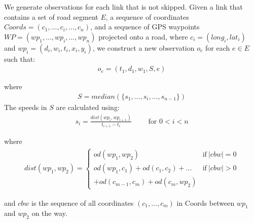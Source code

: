 We generate observations for each link that is not skipped. Given a link that contains a set of road segment $E$, a sequence of coordinates $Coords = (c_1,...,c_i,...,c_n)$, and a sequence of GPS waypoints $WP=(wp_1,...,wp_i,...,wp_n)$ projected onto a road, where $c_i = (long_i, lat_i)$ and $wp_i = (d_i, w_i, t_i, x_i, y_i)$, we construct a new observation $o_e$ for each $e \in E$ such that:
\begin{align*}
o_e = (t_1, d_1, w_1, S, e)
\end{align*}

where
\begin{align*}
S = median(\{s_1,...,s_i,...,s_{n-1}\})
\end{align*}
%
The speeds in $S$ are calculated using:
\begin{align*}
s_i = \frac{dist(wp_i, wp_{i+1})}{t_{i+1} - t_i} \qquad \text{ for } 0 < i < n
\end{align*}

where
\begin{align*}
dist(wp_1, wp_2) = \begin{cases} 
od(wp_1, wp_2) & \text{if}\ |cbw| = 0 \\
od(wp_1, c_1) + od(c_1, c_2) + ... & \text{if}\ |cbw| > 0 \\
+ od(c_{m-1}, c_m) + od(c_m, wp_2)
\end{cases}
\end{align*}

and $cbw$ is the sequence of all coordinates $(c_1,...,c_m)$ in Coords between $wp_1$ and $wp_2$ on the way.
